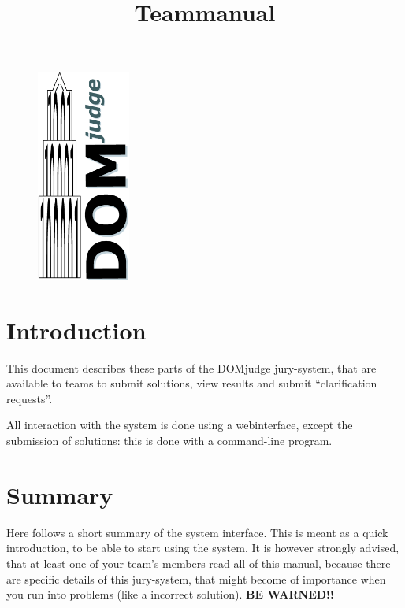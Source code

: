 \documentclass[11pt,a4paper]{article}
\title{Teammanual \DOMjudge}
\newcommand{\DOMjudge}{\textsc{DOM}judge }
\begin{document}
\begin{titlepage}

\maketitle

\vspace{1cm}

\begin{figure}[htbp]
\centerline{\includegraphics[height=7cm]{logos/DOMjudgelogo.eps}}
\end{figure}

\end{titlepage}


\newpage
\tableofcontents

\newpage
\section{Introduction}

This document describes these parts of the \DOMjudge jury-system, that
are available to teams to submit solutions, view results and submit
``clarification requests''.

All interaction with the system is done using a webinterface, except
the submission of solutions: this is done with a command-line program.

\section{Summary}

Here follows a short summary of the system interface. This is meant as
a quick introduction, to be able to start using the system. It is
however strongly advised, that at least one of your team's members
read all of this manual, because there are specific details of this
jury-system, that might become of importance when you run into
problems (like a incorrect solution). \textbf{BE WARNED!!}
\end{document}
